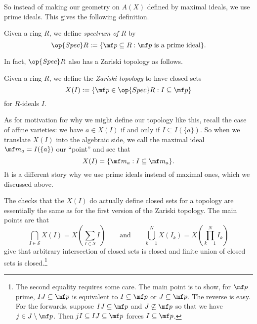 So instead of making our geometry on $A(X)$ defined by maximal ideals, we use prime ideals. This gives the following definition.
\begin{definition}
	Given a ring $R$, we define \textit{spectrum of $R$} by
	\[\op{Spec}R:=\{\mf p\subseteq R:\mf p\text{ is a prime ideal}\}.\]
\end{definition}
In fact, $\op{Spec}R$ also has a Zariski topology as follows.
\begin{definition}
	Given a ring $R$, we define the \textit{Zariski topology} to have closed sets
	\[X(I):=\{\mf p\in\op{Spec}R:I\subseteq\mf p\}\]
	for $R$-ideals $I$.
\end{definition}
\begin{remark}[Nir]
	As for motivation for why we might define our topology like this, recall the case of affine varieties: we have $a\in X(I)$ if and only if $I\subseteq I(\{a\})$. So when we translate $X(I)$ into the algebraic side, we call the maximal ideal $\mf m_a=I(\{a\})$ our ``point'' and see that
	\[X(I)=\{\mf m_a:I\subseteq\mf m_a\}.\]
	It is a different story why we use prime ideals instead of maximal ones, which we discussed above.
\end{remark}
The checks that the $X(I)$ do actually define closed sets for a topology are essentially the same as for the first version of the Zariski topology. The main points are that
\[\bigcap_{I\in\mathcal S}X(I)=X\left(\sum_{I\in\mathcal S}I\right)\qquad\text{and}\qquad\bigcup_{k=1}^NX(I_k)=X\left(\prod_{k=1}^NI_k\right)\]
give that arbitrary intersection of closed sets is closed and finite union of closed sets is closed.\footnote{The second equality requires some care. The main point is to show, for $\mf p$ prime, $IJ\subseteq\mf p$ is equivalent to $I\subseteq\mf p$ or $J\subseteq\mf p$. The reverse is easy. For the forwards, suppose $IJ\subseteq\mf p$ and $J\not\subseteq\mf p$ so that we have $j\in J\setminus\mf p$. Then $jI\subseteq IJ\subseteq\mf p$ forces $I\subseteq\mf p$.}

